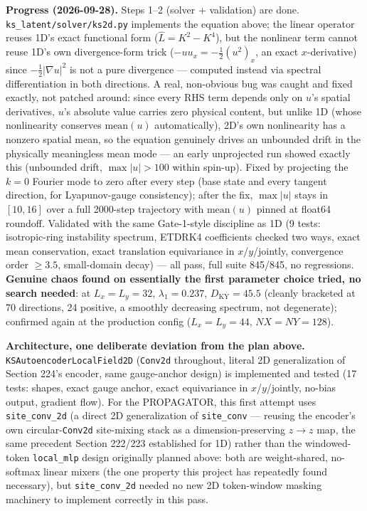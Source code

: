 \documentclass[11pt]{article}
\begin{document}
\textbf{Progress (2026-09-28).} Steps 1--2 (solver + validation) are
done. \texttt{ks\_latent/solver/ks2d.py} implements the equation above;
the linear operator reuses 1D's exact functional form
($\hat L=K^2-K^4$), but the nonlinear term cannot reuse 1D's own
divergence-form trick ($-u u_x=-\tfrac12(u^2)_x$, an exact
$x$-derivative) since $-\tfrac12|\nabla u|^2$ is not a pure divergence
--- computed instead via spectral differentiation in both directions. A
real, non-obvious bug was caught and fixed exactly, not patched around:
since every RHS term depends only on $u$'s spatial derivatives, $u$'s
absolute value carries zero physical content, but unlike 1D (whose
nonlinearity conserves $\mathrm{mean}(u)$ automatically), 2D's own
nonlinearity has a nonzero spatial mean, so the equation genuinely
drives an unbounded drift in the physically meaningless mean mode ---
an early unprojected run showed exactly this (unbounded drift,
$\max|u|>100$ within spin-up). Fixed by projecting the $k=0$ Fourier
mode to zero after every step (base state and every tangent direction,
for Lyapunov-gauge consistency); after the fix, $\max|u|$ stays in
$[10,16]$ over a full 2000-step trajectory with $\mathrm{mean}(u)$
pinned at float64 roundoff. Validated with the same Gate-1-style
discipline as 1D (9 tests: isotropic-ring instability spectrum, ETDRK4
coefficients checked two ways, exact mean conservation, exact
translation equivariance in $x$/$y$/jointly, convergence order
$\geq3.5$, small-domain decay) --- all pass, full suite 845/845, no
regressions. \textbf{Genuine chaos found on essentially the first
parameter choice tried, no search needed}: at $L_x=L_y=32$,
$\lambda_1=0.237$, $D_{\mathrm{KY}}=45.5$ (cleanly bracketed at 70
directions, 24 positive, a smoothly decreasing spectrum, not
degenerate); confirmed again at the production config
($L_x=L_y=44$, $NX=NY=128$).

\textbf{Architecture, one deliberate deviation from the plan above.}
\texttt{KSAutoencoderLocalField2D} (\texttt{Conv2d} throughout,
literal 2D generalization of Section 224's encoder, same gauge-anchor
design) is implemented and tested (17 tests: shapes, exact gauge
anchor, exact equivariance in $x$/$y$/jointly, no-bias output,
gradient flow). For the PROPAGATOR, this first attempt uses
\texttt{site\_conv\_2d} (a direct 2D generalization of
\texttt{site\_conv} --- reusing the encoder's own circular-\texttt{Conv2d}
site-mixing stack as a dimension-preserving $z\to z$ map, the same
precedent Section 222/223 established for 1D) rather than the
windowed-token \texttt{local\_mlp} design originally planned above:
both are weight-shared, no-softmax linear mixers (the one property
this project has repeatedly found necessary), but \texttt{site\_conv\_2d}
needed no new 2D token-window masking machinery to implement correctly
in this pass.
\end{document}
